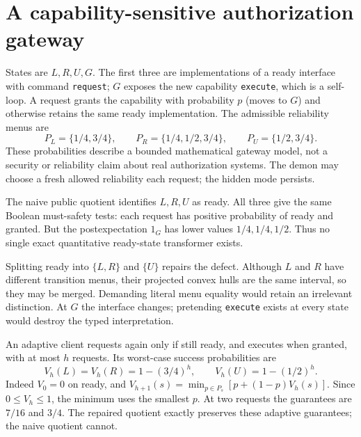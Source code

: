 \documentclass[11pt]{article}
\begin{document}
\section{A capability-sensitive authorization gateway}
States are $L,R,U,G$. The first three are implementations of a ready interface with command \texttt{request}; $G$ exposes the new capability \texttt{execute}, which is a self-loop. A request grants the capability with probability $p$ (moves to $G$) and otherwise retains the same ready implementation. The admissible reliability menus are
\[
 P_L=\{1/4,3/4\},\qquad P_R=\{1/4,1/2,3/4\},\qquad P_U=\{1/2,3/4\}.
\]
These probabilities describe a bounded mathematical gateway model, not a security or reliability claim about real authorization systems. The demon may choose a fresh allowed reliability each request; the hidden mode persists.

The naive public quotient identifies $L,R,U$ as ready. All three give the same Boolean must-safety tests: each request has positive probability of ready and granted. But the postexpectation $1_G$ has lower values $1/4,1/4,1/2$. Thus no single exact quantitative ready-state transformer exists.

Splitting ready into $\{L,R\}$ and $\{U\}$ repairs the defect. Although $L$ and $R$ have different transition menus, their projected convex hulls are the same interval, so they may be merged. Demanding literal menu equality would retain an irrelevant distinction. At $G$ the interface changes; pretending \texttt{execute} exists at every state would destroy the typed interpretation.

An adaptive client requests again only if still ready, and executes when granted, with at most $h$ requests. Its worst-case success probabilities are
\[
 V_h(L)=V_h(R)=1-(3/4)^h,\qquad V_h(U)=1-(1/2)^h.
\]
Indeed $V_0=0$ on ready, and $V_{h+1}(s)=\min_{p\in P_s}[p+(1-p)V_h(s)]$. Since $0\leq V_h\leq1$, the minimum uses the smallest $p$. At two requests the guarantees are $7/16$ and $3/4$. The repaired quotient exactly preserves these adaptive guarantees; the naive quotient cannot.
\end{document}
